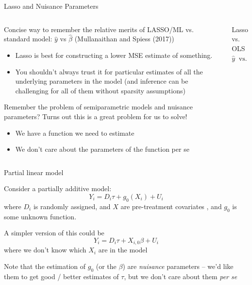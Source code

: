 \documentclass[notes,11pt, aspectratio=169]{beamer}
\newenvironment{wideitemize}{\itemize\addtolength{\itemsep}{10pt}}{\enditemize}
\begin{document}
\begin{frame}{Lasso and Nuisance Parameters}
    \begin{columns}[T] %
    \begin{column}{.8\textwidth}
  \begin{wideitemize}
  \item Concise way to remember the relative merits of LASSO/ML
    vs. standard model: $\hat{y}$ vs $\hat{\beta}$ (Mullanaithan and
    Spiess (2017))
    \begin{itemize}
    \item Lasso is best for constructing a lower MSE estimate of
      something.
    \item You shouldn't always trust it for particular estimates of
      all the underlying parameters in the model (and inference can be 
      challenging for all of them without sparsity assumptions)
    \end{itemize}
  \item Remember the problem of semiparametric models and nuisance
    parameters? Turns out this is a great problem for us to solve!
    \begin{itemize}
    \item We have a function we need to estimate
    \item We don't care about the parameters of the function per se
    \end{itemize}
  \end{wideitemize}
\end{column}
\begin{column}{.3\textwidth}
  \begin{center}
    Lasso     vs.    OLS
$$\hat{y} \;\; \text{vs.} \;\; \hat{\beta}$$
    \end{center}
  \end{column}
\end{columns}

\end{frame}

\begin{frame}{Partial linear model}
  \begin{wideitemize}
  \item Consider a partially additive model:
    $$Y_{i} = D_{i}\tau + g_{0}(X_{i}) + U_{i}$$
    where $D_{i}$ is randomly assigned, and $X$ are pre-treatment covariates , and $g_{0}$ is some unknown function.
  \item A simpler version of this could be
    $$Y_{i} = D_{i}\tau + X_{i,0}\beta + U_{i}$$
    where we don't know which $X_{i}$ are in the model
  \item Note that the estimation of $g_{0}$ (or the $\beta$) are
    \emph{nuisance} parameters -- we'd like them to get good / better
    estimates of $\tau$, but we don't care about them \emph{per se}
  \end{wideitemize}
\end{frame}
\end{document}
